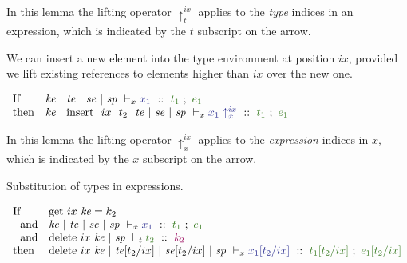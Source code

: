\smallskip\noindent
In this lemma the lifting operator $\uparrow^{ix}_{t}$ applies to the \emph{type} indices in an expression, which is indicated by the $t$ subscript on the arrow. 
\qqed


\begin{lemma}
We can insert a new element into the type environment at position $ix$, provided we lift existing references to elements higher than $ix$ over the new one.
\end{lemma}

$
\begin{array}{ll}
    \pIf        & \TypeX{\mke}{\mte}{\mse}{\msp}
                        {x_1}
                        {t_1}
                        {e_1}
\\  \pthen      & \TypeX{\mke}
                        {\trm{insert}~~ ix~~ t_2~~ \mte}
                        {\mse}
                        {\msp}
                        {\liftXX{ix}{x_1}}
                        {t_1}
                        {e_1}
\end{array}
$

\smallskip\noindent
In this lemma the lifting operator $\uparrow^{ix}_{x}$ applies to the \emph{expression} indices in $x$, which is indicated by the $x$ subscript on the arrow. 
\qqed


\begin{lemma}
Substitution of types in expressions.
\end{lemma}

$
\begin{array}{ll}
    \pIf        & \trm{get}~ ix~ \mke = k_2
\\  ~~\pand     & \TypeX{\mke}{\mte}{\mse}{\msp}
                        {x_1}{t_1}{e_1}
\\  ~~\pand     & \KindT{\trm{delete}~ ix~ \mke}
                        {\msp}
                        {t_2}
                        {k_2}

\\  \pthen      & \TypeX{\trm{delete}~ ix~ \mke}
                        {\mte[t_2/ix]}
                        {\mse[t_2/ix]}
                        {\msp}
                        {x_1[t_2/ix]}
                        {t_1[t_2/ix]}
                        {e_1[t_2/ix]}
\end{array}
$

